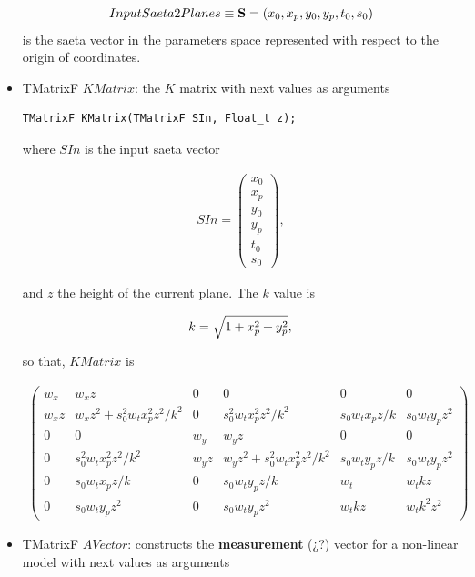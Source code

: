 \documentclass[a4paper]{book}
\let\vec\mathbf  %
\begin{document}
\begin{itemize}
	\begin{equation}
	\notag
	InputSaeta2Planes \equiv \vec{S} = (x_0, x_p, y_0, y_p, t_0, s_0)
	\end{equation}
	is the saeta vector in the parameters space represented with respect to the origin of coordinates.
	
	
	\item TMatrixF $KMatrix$: the $K$ matrix with next values as arguments
	
	\begin{lstlisting}[style=customc]
TMatrixF KMatrix(TMatrixF SIn, Float_t z);
	\end{lstlisting}
	
	where $SIn$ is the input saeta vector
	
	\begin{align*}
	SIn = \left(
	\begin{array}{c}
	x_0\\
	x_p\\
	y_0\\
	y_p\\
	t_0\\
	s_0
	\end{array} \right),
	\end{align*}
	
	and $z$ the height of the current plane. The $k$ value is
	
	\begin{equation}
	\notag
	k = \sqrt{1 + x_p^2 + y_p^2},
	\end{equation}
	
	so that, $KMatrix$ is
	
	\begin{align*}
	\left(
	\begin{array}{cccccc}
	w_x   & w_x z & 0 & 0 & 0 & 0\\
	w_x z & w_x z^2 + s_0^2 w_t x_p^2 z^2/k^2 & 0 & s_0^2 w_t x_p^2 z^2 /k^2 & s_0 w_t x_p z/k & s_0 w_t y_p z^2 \\
	0 & 0 & w_y & w_y z & 0 & 0\\
	0 & s_0^2 w_t x_p^2 z^2 /k^2 & w_y z & w_y z^2 + s_0^2 w_t x_p^2 z^2/k^2 & s_0 w_t y_p z/k & s_0 w_t y_p z^2\\
	0 & s_0 w_t x_p z/k & 0 & s_0 w_t y_p z/k & w_t & w_t k z\\
	0 & s_0 w_t y_p z^2 & 0 & s_0 w_t y_p z^2 & w_t k z & w_t k^2 z^2
	\end{array} \right)
	\end{align*}
	
	\item TMatrixF $AVector$: constructs the \textbf{measurement} (¿?) vector for a non-linear model with next values as arguments
	

\end{itemize}
\end{document}

